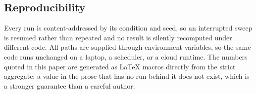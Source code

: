 \subsection{Reproducibility}

Every run is content-addressed by its condition and seed, so an interrupted
sweep is resumed rather than repeated and no result is silently recomputed
under different code. All paths are supplied through environment variables, so
the same code runs unchanged on a laptop, a scheduler, or a cloud runtime. The
numbers quoted in this paper are generated as \LaTeX{} macros directly from the
strict aggregate: a value in the prose that has no run behind it does not
exist, which is a stronger guarantee than a careful author.
